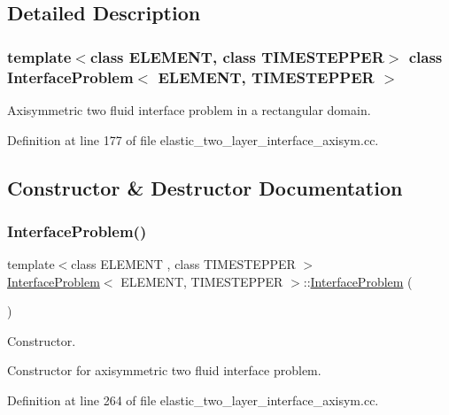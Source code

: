\subsection{Detailed Description}
\subsubsection*{template$<$class E\+L\+E\+M\+E\+NT, class T\+I\+M\+E\+S\+T\+E\+P\+P\+ER$>$\newline
class Interface\+Problem$<$ E\+L\+E\+M\+E\+N\+T, T\+I\+M\+E\+S\+T\+E\+P\+P\+E\+R $>$}

Axisymmetric two fluid interface problem in a rectangular domain. 

Definition at line 177 of file elastic\+\_\+two\+\_\+layer\+\_\+interface\+\_\+axisym.\+cc.



\subsection{Constructor \& Destructor Documentation}
\mbox{\label{classInterfaceProblem_a5889be7fc8eab5d222f1bfb750c845ba}} 
\subsubsection{\texorpdfstring{Interface\+Problem()}{InterfaceProblem()}\hspace{0.1cm}{\footnotesize\ttfamily [1/2]}}
{\footnotesize\ttfamily template$<$class E\+L\+E\+M\+E\+NT , class T\+I\+M\+E\+S\+T\+E\+P\+P\+ER $>$ \\
\hyperlink{classInterfaceProblem}{Interface\+Problem}$<$ E\+L\+E\+M\+E\+NT, T\+I\+M\+E\+S\+T\+E\+P\+P\+ER $>$\+::\hyperlink{classInterfaceProblem}{Interface\+Problem} (\begin{DoxyParamCaption}{ }\end{DoxyParamCaption})}



Constructor. 

Constructor for axisymmetric two fluid interface problem. 

Definition at line 264 of file elastic\+\_\+two\+\_\+layer\+\_\+interface\+\_\+axisym.\+cc.



